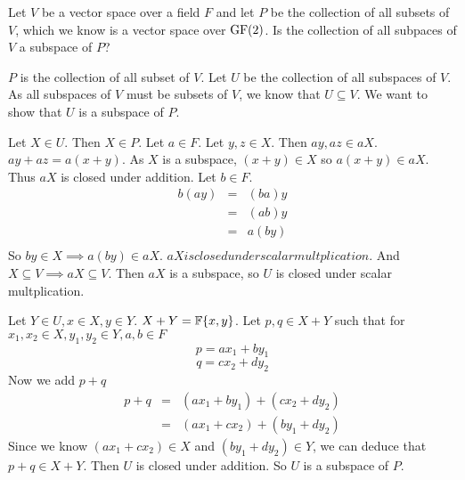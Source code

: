 \begin{problem}[Golan 93]

Let $V$ be a vector space over a field $F$ and let $P$ be the collection of all
subsets of $V$, which we know is a vector space over $\operatorname{GF}(2)$.  Is the
collection of all subpaces of $V$ a subspace of $P$?

\end{problem}
\smallskip
\begin{solution}

$P$ is the collection of all subset of $V$. Let $U$ be the collection of all subspaces of $V$. As all subspaces of $V$ must be subsets of $V$, we know that $U \subseteq V$. We want to show that $U$ is a subspace of $P$.

Let $X \in U$. Then $X \in P$. Let $a \in F$. Let $y,z \in X$.  Then $ay, az \in aX$. $ay + az = a(x+y)$.  As $X$ is a subspace, $(x+y) \in X$ so $a(x+y) \in aX$. Thus $aX$ is closed under addition. Let $b \in F$. 
\begin{eqnarray*}
b(ay) & = & (ba)y \\
	  & = & (ab)y \\
	  & = & a(by) \\
\end{eqnarray*}
So $by \in X \implies a(by) \in aX$. $aX is closed under scalar multplication.$ And $X \subseteq V \implies aX \subseteq V$. Then $aX$ is a subspace, so $U$ is closed under scalar multplication.

Let $Y \in U, x \in X, y \in Y$. $X + Y = \mathbb{F}\{x,y\}$. Let $p,q \in X + Y$ such that for $x_1,x_2 \in X, y_1,y_2 \in Y, a,b \in F$
$$p = ax_1 + by_1$$
$$q = cx_2 + dy_2$$
Now we add $p + q$
\begin{eqnarray}
p + q & = &(ax_1 + by_1) + (cx_2 + dy_2) \\
	  & = &(ax_1 + cx_2) + (by_1 + dy_2) 
\end{eqnarray}
Since we know $(ax_1 + cx_2) \in X$ and $(by_1 + dy_2) \in Y$, we can deduce that $p + q \in X + Y$. Then $U$ is closed under addition.  So $U$ is a subspace of $P$.
\end{solution}
\probskip



